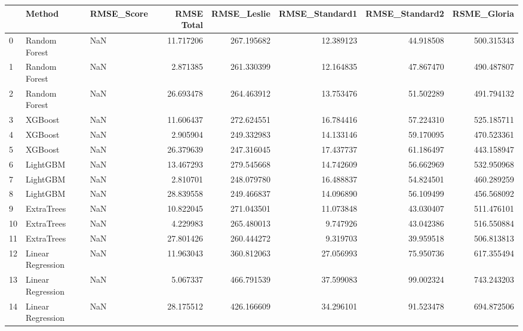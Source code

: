 \begin{tabular}{lllrrrrr}
\toprule
{} &             Method & RMSE\_Score &  RMSE Total &  RMSE\_Leslie &  RMSE\_Standard1 &  RMSE\_Standard2 &  RSME\_Gloria \\
\midrule
0  &      Random Forest &        NaN &   11.717206 &   267.195682 &       12.389123 &       44.918508 &   500.315343 \\
1  &      Random Forest &        NaN &    2.871385 &   261.330399 &       12.164835 &       47.867470 &   490.487807 \\
2  &      Random Forest &        NaN &   26.693478 &   264.463912 &       13.753476 &       51.502289 &   491.794132 \\
3  &            XGBoost &        NaN &   11.606437 &   272.624551 &       16.784416 &       57.224310 &   525.185711 \\
4  &            XGBoost &        NaN &    2.905904 &   249.332983 &       14.133146 &       59.170095 &   470.523361 \\
5  &            XGBoost &        NaN &   26.379639 &   247.316045 &       17.437737 &       61.186497 &   443.158947 \\
6  &           LightGBM &        NaN &   13.467293 &   279.545668 &       14.742609 &       56.662969 &   532.950968 \\
7  &           LightGBM &        NaN &    2.810701 &   248.079780 &       16.488837 &       54.824501 &   460.289259 \\
8  &           LightGBM &        NaN &   28.839558 &   249.466837 &       14.096890 &       56.109499 &   456.568092 \\
9  &         ExtraTrees &        NaN &   10.822045 &   271.043501 &       11.073848 &       43.030407 &   511.476101 \\
10 &         ExtraTrees &        NaN &    4.229983 &   265.480013 &        9.747926 &       43.042386 &   516.550884 \\
11 &         ExtraTrees &        NaN &   27.801426 &   260.444272 &        9.319703 &       39.959518 &   506.813813 \\
12 &  Linear Regression &        NaN &   11.963043 &   360.812063 &       27.056993 &       75.950736 &   617.355494 \\
13 &  Linear Regression &        NaN &    5.067337 &   466.791539 &       37.599083 &       99.002324 &   743.243203 \\
14 &  Linear Regression &        NaN &   28.175512 &   426.166609 &       34.296101 &       91.523478 &   694.872506 \\
\bottomrule
\end{tabular}
